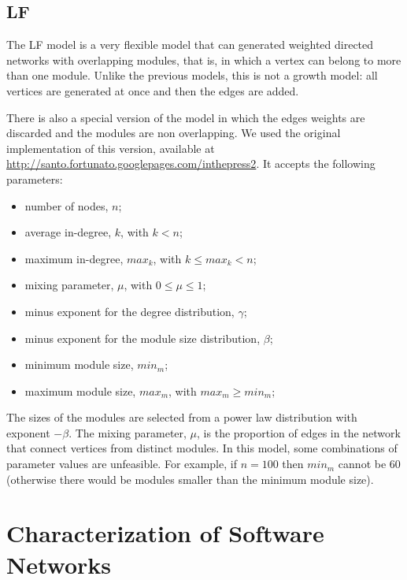 \subsection{LF}

The LF model \cite{Lancichinetti2009} is a very flexible model that can
generated weighted directed networks with overlapping modules, that is, in which
a vertex can belong to more than one module. Unlike the previous models, this is
not a growth model: all vertices are generated at once and then the edges are
added.

There is also a special version of the model in which the edges weights are
discarded and the modules are non overlapping. We used the original
implementation of this version, available at
\url{http://santo.fortunato.googlepages.com/inthepress2}. It accepts the
following parameters:

\begin{itemize}
\item number of nodes, $n$;
\item average in-degree, $k$, with $k < n$;
\item maximum in-degree, $max_k$, with $k \le max_k < n$;
\item mixing parameter, $\mu$, with $0 \le \mu \le 1$;
\item minus exponent for the degree distribution, $\gamma$;
\item minus exponent for the module size distribution, $\beta$;
\item minimum module size, $min_m$;
\item maximum module size, $max_m$, with $max_m \ge min_m$;
\end{itemize}

The sizes of the modules are selected from a power law distribution with
exponent $-\beta$. The mixing parameter, $\mu$, is the proportion of edges in the
network that connect vertices from distinct modules. In this model, some
combinations of parameter values are unfeasible. For example, if $n = 100$ then
$min_m$ cannot be 60 (otherwise there would be modules smaller than the minimum
module size).


\section{Characterization of Software Networks} \label{sec:characterization}

